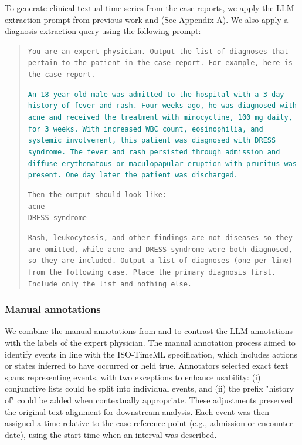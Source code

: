 \documentclass[pmlr]{jmlr}%
\begin{document}
To generate clinical textual time series from the case reports, we apply the LLM extraction prompt from previous work \cite{noroozizadeh2025reconstructing} and \cite{wang2025large} (See Appendix A). 
We also apply a diagnosis extraction query using the following prompt:
\begin{quote}
\texttt{You are an expert physician.  Output the list of diagnoses that pertain to the patient in the case report. For example, here is the case report.}

\textcolor{teal}{\texttt{An 18-year-old male was admitted to the hospital with a 3-day history of fever and rash. Four weeks ago, he was diagnosed with acne and received the treatment with minocycline, 100 mg daily, for 3 weeks. With increased WBC count, eosinophilia, and systemic involvement, this patient was diagnosed with DRESS syndrome. The fever and rash persisted through admission and diffuse erythematous or maculopapular eruption with pruritus was present. One day later the patient was discharged.}}

\texttt{Then the output should look like:}\\
    \texttt{acne} \\
    \texttt{DRESS syndrome}
    
\texttt{Rash, leukocytosis, and other findings are not diseases so they are omitted, while acne and DRESS syndrome were both diagnosed, so they are included.
Output a list of diagnoses (one per line) from the following case. Place the primary diagnosis first. Include only the list and nothing else.}
\end{quote}

\subsubsection*{Manual annotations}
We combine the manual annotations from \cite{wang2025large} and \cite{noroozizadeh2025reconstructing} to contrast the LLM annotations with the labels of the expert physician. The manual annotation process aimed to identify events in line with the ISO-TimeML specification, which includes actions or states inferred to have occurred or held true. Annotators selected exact text spans representing events, with two exceptions to enhance usability: (i) conjunctive lists could be split into individual events, and (ii) the prefix "history of" could be added when contextually appropriate. These adjustments preserved the original text alignment for downstream analysis. Each event was then assigned a time relative to the case reference point (e.g., admission or encounter date), using the start time when an interval was described.
 
\end{document}
